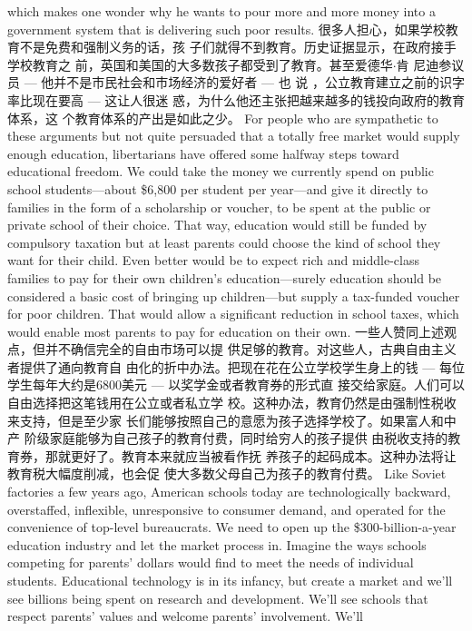 \begin{paracol}{2}
which makes one wonder why he wants to pour more and more
money into a government system that is delivering such poor
results.
\switchcolumn
很多人担心，如果学校教育不是免费和强制义务的话，孩
子们就得不到教育。历史证据显示，在政府接手学校教育之
前，英国和美国的大多数孩子都受到了教育。甚至爱德华$\cdot$肯
尼迪参议员 --- 他并不是市民社会和市场经济的爱好者 --- 也
说 ，公立教育建立之前的识字率比现在要高 --- 这让人很迷
惑，为什么他还主张把越来越多的钱投向政府的教育体系，这
个教育体系的产出是如此之少。
\switchcolumn*
For people who are sympathetic to these arguments but not
quite persuaded that a totally free market would supply enough
education, libertarians have offered some halfway steps toward
educational freedom. We could take the money we currently
spend on public school students---about \$6,800 per student
per year---and give it directly to families in the form of a scholarship or voucher, to be spent at the public or private school of
their choice. That way, education would still be funded by compulsory taxation but at least parents could choose the kind of
school they want for their child. Even better would be to expect
rich and middle-class families to pay for their own children's education---surely education should be considered a basic cost of
bringing up children---but supply a tax-funded voucher for
poor children. That would allow a significant reduction in
school taxes, which would enable most parents to pay for education on their own.
\switchcolumn
一些人赞同上述观点，但并不确信完全的自由市场可以提
供足够的教育。对这些人，古典自由主义者提供了通向教育自
由化的折中办法。把现在花在公立学校学生身上的钱 --- 每位
学生每年大约是6800美元 --- 以奖学金或者教育券的形式直
接交给家庭。人们可以自由选择把这笔钱用在公立或者私立学
校。这种办法，教育仍然是由强制性税收来支持，但是至少家
长们能够按照自己的意愿为孩子选择学校了。如果富人和中产
阶级家庭能够为自己孩子的教育付费，同时给穷人的孩子提供
由税收支持的教育券，那就更好了。教育本来就应当被看作抚
养孩子的起码成本。这种办法将让教育税大幅度削减，也会促
使大多数父母自己为孩子的教育付费。
\switchcolumn*
Like Soviet factories a few years ago, American schools today
are technologically backward, overstaffed, inflexible, unresponsive to consumer demand, and operated for the convenience of
top-level bureaucrats. We need to open up the \$300-billion-a-year education industry and let the market process in. Imagine
the ways schools competing for parents' dollars would find to
meet the needs of individual students. Educational technology
is in its infancy, but create a market and we'll see billions being
spent on research and development. We'll see schools that respect parents' values and welcome parents' involvement. We'll

\end{paracol}
